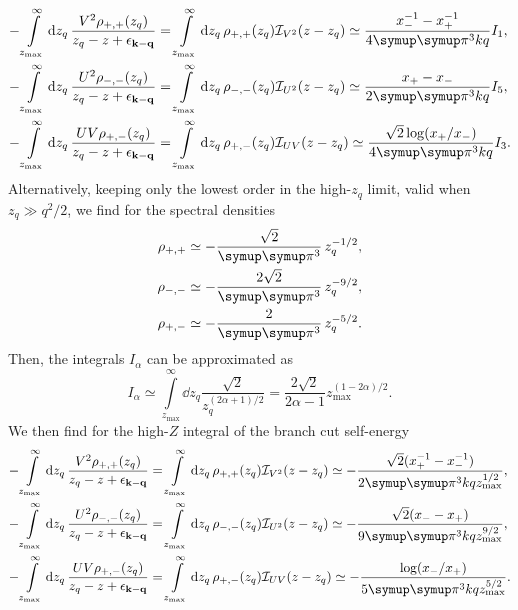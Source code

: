 \documentclass[10pt,a4paper]{article}
\let\canpi\pi
\renewcommand\pi{\symup\canpi}%
\newcommand{\epskq}{\ensuremath{\epsilon_{\vb{k}-\vb{q}}}}
\begin{document}
\begin{align}
    -\int\limits_{z_\mathrm{max}}^{\infty} \dd{z_q} \frac{V^2 \rho_{+,+}(z_q)}{z_q-z+\epskq}
    &=\int\limits_{z_\mathrm{max}}^{\infty} \dd{z_q} \rho_{+,+}(z_q) \mathcal{I}_{V^2}(z-z_q) 
    \simeq \frac{x_-^{-1} - x_+^{-1}}{4\pi^3 kq} I_1,\\
    -\int\limits_{z_\mathrm{max}}^{\infty} \dd{z_q} \frac{U^2 \rho_{-,-}(z_q)}{z_q-z+\epskq}
    &=\int\limits_{z_\mathrm{max}}^{\infty} \dd{z_q} \rho_{-,-}(z_q) \mathcal{I}_{U^2}(z-z_q) 
    \simeq \frac{x_+ - x_-}{2\pi^3 kq} I_5, \\
    -\int\limits_{z_\mathrm{max}}^{\infty} \dd{z_q} \frac{UV \rho_{+,-}(z_q)}{z_q-z+\epskq}
    &=\int\limits_{z_\mathrm{max}}^{\infty} \dd{z_q} \rho_{+,-}(z_q) \mathcal{I}_{UV}(z-z_q) 
    \simeq \frac{\sqrt{2} \log(x_+/x_-)}{4\pi^3 kq} I_3.
\end{align}
Alternatively, keeping only the lowest order in the high-$z_q$ limit, valid when $z_q\gg q^2/2$, we find for the spectral densities 
\begin{align}
    \rho_{+,+} &\simeq -\frac{\sqrt{2}}{\pi^3} \, z_q^{-1/2}, \\
    \rho_{-,-} &\simeq -\frac{2\sqrt{2}}{\pi^3} \, z_q^{-9/2}, \\
    \rho_{+,-} &\simeq -\frac{2}{\pi^3} \, z_q^{-5/2}.
\end{align}
Then, the integrals $I_\alpha$ can be approximated as 
\begin{equation}
    I_\alpha \simeq \int\limits_{z_\mathrm{max}}^{\infty} \dd{z_q} \frac{\sqrt{2}}{z_q^{(2\alpha+1)/2}} = \frac{2 \sqrt{2}}{2\alpha-1} z_\mathrm{max}^{(1-2\alpha)/2}.
\end{equation}
We then find for the high-$Z$ integral of the branch cut self-energy
\begin{align}
    -\int\limits_{z_\mathrm{max}}^{\infty} \dd{z_q} \frac{V^2 \rho_{+,+}(z_q)}{z_q-z+\epskq}
    &=\int\limits_{z_\mathrm{max}}^{\infty} \dd{z_q} \rho_{+,+}(z_q) \mathcal{I}_{V^2}(z-z_q) 
    \simeq -\frac{\sqrt{2}(x_+^{-1} - x_-^{-1})}{2\pi^3 kq z_\mathrm{max}^{1/2}},\\
    -\int\limits_{z_\mathrm{max}}^{\infty} \dd{z_q} \frac{U^2 \rho_{-,-}(z_q)}{z_q-z+\epskq}
    &=\int\limits_{z_\mathrm{max}}^{\infty} \dd{z_q} \rho_{-,-}(z_q) \mathcal{I}_{U^2}(z-z_q) 
    \simeq -\frac{\sqrt{2}(x_- - x_+)}{9\pi^3 kq z_\mathrm{max}^{9/2}}, \\
    -\int\limits_{z_\mathrm{max}}^{\infty} \dd{z_q} \frac{UV \rho_{+,-}(z_q)}{z_q-z+\epskq}
    &=\int\limits_{z_\mathrm{max}}^{\infty} \dd{z_q} \rho_{+,-}(z_q) \mathcal{I}_{UV}(z-z_q) 
    \simeq -\frac{\log(x_-/x_+)}{5\pi^3 kq z_\mathrm{max}^{5/2}}.
\end{align}
\end{document}

